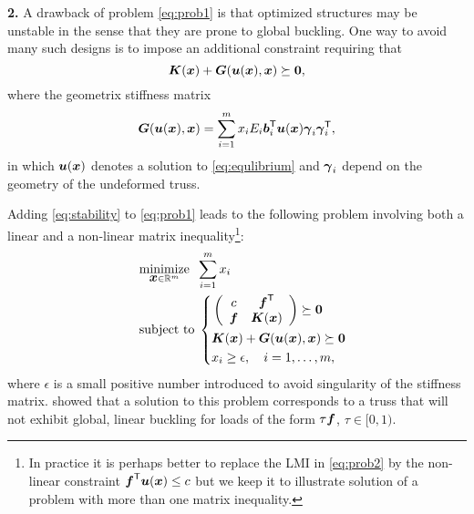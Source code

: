 \documentclass{article}
\newcommand{\bm}[1]{\mbox{\boldmath $#1$}}
\newcommand{\T}{\textsf{T}}
\begin{document}
\vskip2mm
\noindent\textbf{2.} 
A drawback of problem \eqref{eq:prob1} is that optimized structures may be unstable in the sense that they are prone to global buckling. One way to avoid many such designs is to impose an additional constraint \cite{Kocvara:2002} requiring that
\begin{equation}\label{eq:stability}
\bm{K}(\bm{x}) + \bm{G}(\bm{u}(\bm{x}),\bm{x}) \succeq \bm{0},
\end{equation}
where the geometrix stiffness matrix
\begin{equation}\nonumber
\bm{G}(\bm{u}(\bm{x}),\bm{x}) = \sum_{i=1}^{m}x_{i}E_{i}\bm{b}_{i}^{\T}\bm{u}(\bm{x})\bm{\gamma}_{i}\bm{\gamma}_{i}^{\T},
\end{equation}
in which $\bm{u}(\bm{x})$ denotes a solution to \eqref{eq:equlibrium} and $\bm{\gamma}_{i}$ depend on the geometry of the undeformed truss. 

Adding \eqref{eq:stability} to \eqref{eq:prob1} leads to the following problem involving both a linear and a non-linear matrix 
inequality\footnote{In practice it is perhaps better to replace the LMI in \eqref{eq:prob2} by the non-linear constraint $\bm{f}^{\T}\bm{u}(\bm{x})\leq c$ but we keep it to illustrate solution of a problem with more than one matrix inequality.}:
\begin{equation}\label{eq:prob2}
\quad
	\begin{aligned}
	&	\underset{\bm{x}\in\mathbb{R}^{m}}{\mbox{minimize}} \;\; \sum_{i=1}^{m}x_{i} \\
	&	\mbox{subject to} \;
	\left\{
		\begin{aligned}
		  & \left(
\begin{array}{cc}
c &\bm{f}^{\T}         \\
\bm{f} & \bm{K}(\bm{x})
\end{array}
\right) \succeq \bm{0} \\
			& \bm{K}(\bm{x}) + \bm{G}(\bm{u}(\bm{x}),\bm{x}) \succeq \bm{0} \\
			& x_{i} \geq \epsilon , \quad i=1,\ldots,m,
		\end{aligned}
		\right.
	\end{aligned}
\end{equation}
where $\epsilon$ is a small positive number introduced to avoid singularity of the stiffness matrix. \citet{Kocvara:2002} showed that a solution to this problem corresponds to a truss that will not exhibit global, linear buckling for loads
of the form $\tau\bm{f}$, $\tau\in[0,1)$.
\end{document}
